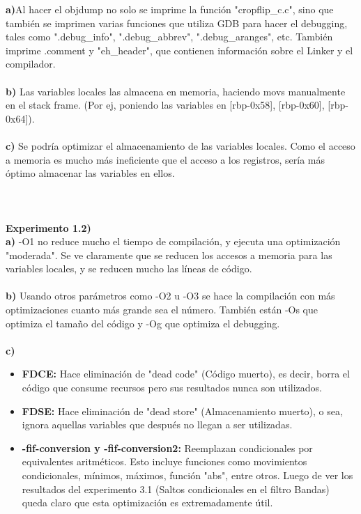 \documentclass[a4paper]{article}
\begin{document}
\noindent \textbf{a)}Al hacer el objdump no solo se imprime la funci\'{o}n "cropflip\_c.c", sino que tambi\'{e}n se imprimen varias funciones que utiliza GDB para hacer el debugging, tales como ".debug\_info", ".debug\_abbrev", ".debug\_aranges", etc. Tambi\'{e}n imprime .comment y "eh\_header", que contienen informaci\'{o}n sobre el Linker y el compilador.\\ \\
 \textbf{b)} Las variables locales las almacena en memoria, haciendo movs manualmente en el stack frame. (Por ej, poniendo las variables en [rbp-0x58], [rbp-0x60], [rbp-0x64]).\\ \\
 \textbf{c)} Se podr\'{i}a optimizar el almacenamiento de las variables locales. Como el acceso a memoria es mucho m\'{a}s ineficiente que el acceso a los registros, ser\'{i}a m\'{a}s \'{o}ptimo almacenar las variables en ellos. \\ \\ \\ \\

\textbf{Experimento 1.2)}\\

\noindent \textbf{a)} -O1 no reduce mucho el tiempo de compilaci\'{o}n, y ejecuta una optimizaci\'{o}n "moderada". Se ve claramente que se reducen los accesos a memoria para las variables locales, y se reducen mucho las l\'{i}neas de c\'{o}digo.\\ \\
 \textbf{b)} Usando otros par\'{a}metros como -O2 u -O3 se hace la compilaci\'{o}n con m\'{a}s optimizaciones cuanto m\'{a}s grande sea el n\'{u}mero. Tambi\'{e}n est\'{a}n -Os que optimiza el tama\~{n}o del c\'{o}digo y -Og que optimiza el debugging.\\ \\



\noindent \textbf{c)}

\begin{itemize}

	\item \textbf{FDCE:} Hace eliminaci\'{o}n de "dead code" (C\'{o}digo muerto), es decir, borra el c\'{o}digo que consume recursos pero sus resultados nunca son utilizados.
	\item \textbf{FDSE:} Hace eliminaci\'{o}n de "dead store" (Almacenamiento muerto), o sea, ignora aquellas variables que despu\'{e}s no llegan a ser utilizadas. 
	\item \textbf{-fif-conversion y -fif-conversion2:} Reemplazan condicionales por equivalentes aritm\'{e}ticos. Esto incluye funciones como movimientos condicionales, m\'{i}nimos, m\'{a}ximos, funci\'{o}n "abs", entre otros. Luego de ver los resultados del experimento 3.1 (Saltos condicionales en el filtro Bandas) queda claro que esta optimizaci\'{o}n es extremadamente \'{u}til.

\end{itemize}
\end{document}
